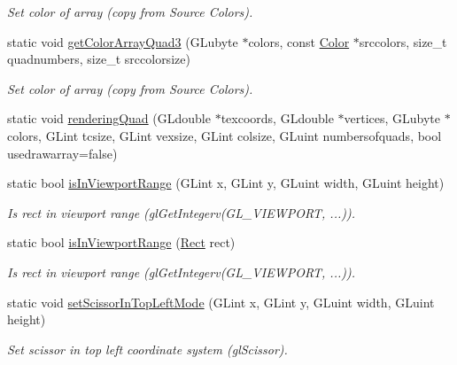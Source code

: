 \begin{DoxyCompactItemize}
\begin{DoxyCompactList}\small\item\em Set color of array (copy from Source Colors). \item\end{DoxyCompactList}\item 
static void \hyperlink{class_f2_c_1_1_render_manager_a45a751d1c5fb65d5651e3044f79474b6}{getColorArrayQuad3} (GLubyte $\ast$colors, const \hyperlink{class_f2_c_1_1_color}{Color} $\ast$srccolors, size\_\-t quadnumbers, size\_\-t srccolorsize)
\begin{DoxyCompactList}\small\item\em Set color of array (copy from Source Colors). \item\end{DoxyCompactList}\item 
static void \hyperlink{class_f2_c_1_1_render_manager_aa43c34d80179016ae3be4d58fb69bff9}{renderingQuad} (GLdouble $\ast$texcoords, GLdouble $\ast$vertices, GLubyte $\ast$colors, GLint tcsize, GLint vexsize, GLint colsize, GLuint numbersofquads, bool usedrawarray=false)
\item 
static bool \hyperlink{class_f2_c_1_1_render_manager_a2432cc5d6aa39929cf20ad8090d6680b}{isInViewportRange} (GLint x, GLint y, GLuint width, GLuint height)
\begin{DoxyCompactList}\small\item\em Is rect in viewport range (glGetIntegerv(GL\_\-VIEWPORT, ...)). \item\end{DoxyCompactList}\item 
static bool \hyperlink{class_f2_c_1_1_render_manager_abd7cf1932179642dc139b0eed35245e0}{isInViewportRange} (\hyperlink{class_f2_c_1_1_rect}{Rect} rect)
\begin{DoxyCompactList}\small\item\em Is rect in viewport range (glGetIntegerv(GL\_\-VIEWPORT, ...)). \item\end{DoxyCompactList}\item 
static void \hyperlink{class_f2_c_1_1_render_manager_aefa9e4facd6c4f397106cc841b271f51}{setScissorInTopLeftMode} (GLint x, GLint y, GLuint width, GLuint height)
\begin{DoxyCompactList}\small\item\em Set scissor in top left coordinate system (glScissor). \item\end{DoxyCompactList}\item 

\end{DoxyCompactItemize}
